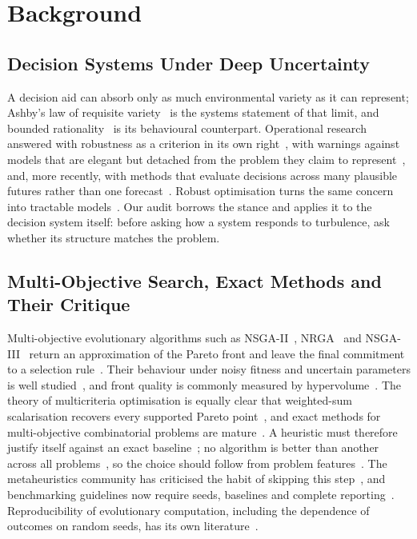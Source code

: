 \documentclass[systems,article,accept,moreauthors,pdftex]{Definitions/mdpi}
\begin{document}
\section{Background}\label{sec:background}

\subsection{Decision Systems Under Deep Uncertainty}
A decision aid can absorb only as much environmental variety as it can represent; Ashby's
law of requisite variety~\cite{ashby1956cybernetics} is the systems statement of that
limit, and bounded rationality~\cite{simon1955behavioral} is its behavioural counterpart.
Operational research answered with robustness as a criterion in its own
right~\cite{rosenhead1972robustness}, with warnings against models that are elegant but
detached from the problem they claim to represent~\cite{ackoff1979future}, and, more
recently, with methods that evaluate decisions across many plausible futures rather than
one forecast~\cite{lempert2006robust,walker2003uncertainty,marchau2019deep}. Robust
optimisation turns the same concern into tractable models~\cite{bental2002robust,bertsimas2004price}.
Our audit borrows the stance and applies it to the decision system itself: before asking
how a system responds to turbulence, ask whether its structure matches the problem.

\subsection{Multi-Objective Search, Exact Methods and Their Critique}
Multi-objective evolutionary algorithms such as NSGA-II~\cite{deb2002nsga2}, NRGA~\cite{aljadaan2008nrga}
and NSGA-III~\cite{deb2014nsga3} return an approximation of the Pareto front and leave the
final commitment to a selection rule~\cite{branke2004knees}. Their behaviour under noisy
fitness and uncertain parameters is well studied~\cite{jin2005uncertain,deb2006robustness,beyer2007robust,ide2016robustness},
and front quality is commonly measured by hypervolume~\cite{zitzler1999spea}. The theory of
multicriteria optimisation is equally clear that weighted-sum scalarisation recovers every
supported Pareto point~\cite{ehrgott2005multicriteria,das1998nbi}, and exact methods for
multi-objective combinatorial problems are mature~\cite{ehrgott2000moco}. A heuristic must
therefore justify itself against an exact \linebreak  baseline~\cite{hooker1995testing}; no algorithm
is better than another across all problems~\cite{wolpert1997nfl}, so the choice should
follow from problem features~\cite{kerschke2019selection}. The metaheuristics community has
criticised the habit of skipping this step~\cite{sorensen2015metaphor,aranha2022metaphor},
and benchmarking guidelines now require seeds, baselines and complete
reporting~\cite{bartzbeielstein2020benchmarking}. Reproducibility of evolutionary
computation, including the dependence of outcomes on random seeds, has its own
literature~\cite{lopezibanez2021reproducibility}.
\end{document}
